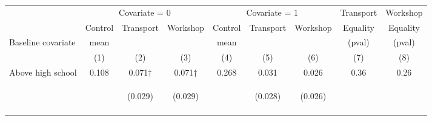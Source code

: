 \begin{tabular}{lcccccccc}
\hline \noalign{\smallskip} & \multicolumn{3}{c}{Covariate = 0} & \multicolumn{3}{c}{Covariate = 1} & Transport & Workshop\\
\cmidrule(lr){2-4}\cmidrule(lr){5-7}\cmidrule(lr){8-9} & Control & {Transport} & {Workshop} & Control & {Transport} & {Workshop} & {Equality} & {Equality}\\
Baseline covariate & mean &  &  & mean &  &  & (pval) & (pval)\\
 & (1) & (2) & (3) & (4) & (5) & (6) & (7) & (8)\\
\noalign{\smallskip}\hline \noalign{\smallskip}Above high school & 0.108 & 0.071† & 0.071† & 0.268 & 0.031 & 0.026 & 0.36 & 0.26\\
 & \begin{footnotesize}\end{footnotesize} & \begin{footnotesize}(0.029)\end{footnotesize} & \begin{footnotesize}(0.029)\end{footnotesize} & \begin{footnotesize}\end{footnotesize} & \begin{footnotesize}(0.028)\end{footnotesize} & \begin{footnotesize}(0.026)\end{footnotesize} & \begin{footnotesize}\end{footnotesize} & \begin{footnotesize}\end{footnotesize}\\
 & \begin{footnotesize}\end{footnotesize} & \begin{footnotesize}[0.021]\end{footnotesize} & \begin{footnotesize}[0.020]\end{footnotesize} & \begin{footnotesize}\end{footnotesize} & \begin{footnotesize}[0.505]\end{footnotesize} & \begin{footnotesize}[0.571]\end{footnotesize} & \begin{footnotesize}\end{footnotesize} & \begin{footnotesize}\end{footnotesize}\\

\end{tabular}
